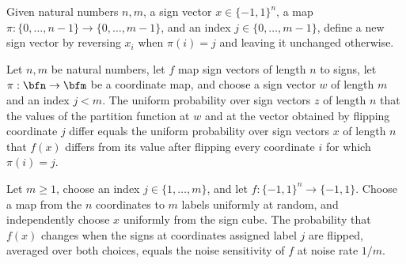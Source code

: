 \begin{definition}
\label{FABL.flipPartitionFiber}
\leanok
Given natural numbers $n,m$, a sign vector $x\in\{−1,1\}^n$, a map
$\pi:\{0,\ldots,n-1\}\to\{0,\ldots,m-1\}$, and an index $j\in\{0,\ldots,m-1\}$, define a
new sign vector by reversing $x_i$ when $\pi(i)=j$ and leaving it unchanged otherwise.
\end{definition}

\begin{theorem}
\label{FABL.expect_partitionFunction_flip}
\leanok
{}
Let $n,m$ be natural numbers, let $f$ map sign vectors of length $n$ to signs, let
$\pi:\bfn\to\bfm$ be a coordinate map, and choose a sign vector $w$ of length $m$ and an
index $j<m$. The uniform probability over sign vectors $z$ of length $n$ that the values
of the partition function at $w$ and at the vector obtained by flipping coordinate $j$
differ equals the uniform probability over sign vectors $x$ of length $n$ that $f(x)$
differs from its value after flipping every coordinate $i$ for which $\pi(i)=j$.
\end{theorem}

\begin{theorem}
\label{FABL.expect_flipPartitionFiber_eq_noiseSensitivity}
\leanok
{}
Let $m\geq 1$, choose an index $j\in\{1,\ldots,m\}$, and let $f:\{-1,1\}^n\to\{-1,1\}$.
Choose a map from the $n$ coordinates to $m$ labels uniformly at random, and
independently choose $x$ uniformly from the sign cube. The probability that $f(x)$
changes when the signs at coordinates assigned label $j$ are flipped, averaged over both
choices, equals the noise sensitivity of $f$ at noise rate $1/m$.
\end{theorem}

